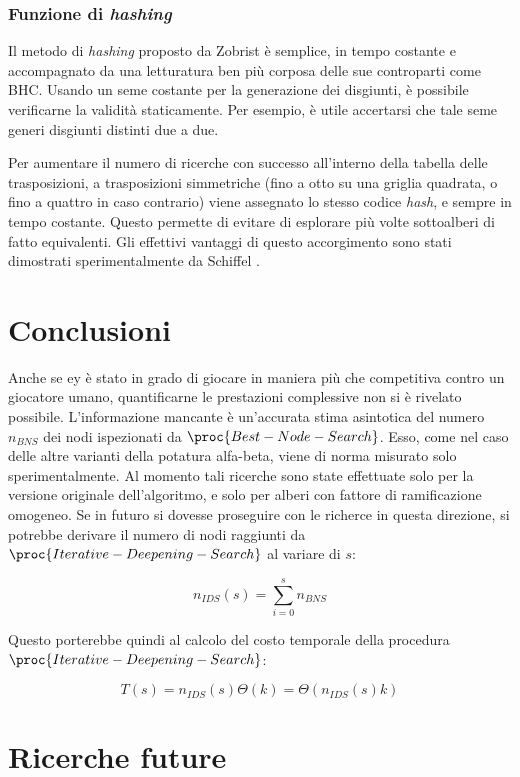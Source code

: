 \documentclass{article}
\begin{document}
\subsubsection{Funzione di \emph{hashing}}

Il metodo di \emph{hashing} proposto da Zobrist
\cite{edsoai.ocn79990521120120101} è semplice, in tempo costante e accompagnato
da una letturatura ben più corposa delle sue controparti come BHC. Usando un
seme costante per la generazione dei disgiunti, è possibile verificarne la
validità staticamente. Per esempio, è utile accertarsi che tale seme generi
disgiunti distinti due a due.

Per aumentare il numero di ricerche con successo all'interno della tabella delle
trasposizioni, a trasposizioni simmetriche (fino a otto su una griglia quadrata,
o fino a quattro in caso contrario) viene assegnato lo stesso codice
\emph{hash}, e sempre in tempo costante. Questo permette di evitare di esplorare
più volte sottoalberi di fatto equivalenti. Gli effettivi vantaggi di questo
accorgimento sono stati dimostrati sperimentalmente da Schiffel \cite{schiffel}.

\section{Conclusioni}

Anche se {
    ey
} è stato in grado di giocare in maniera più che competitiva contro un giocatore
umano, quantificarne le prestazioni complessive non si è rivelato possibile.
L'informazione mancante è un'accurata stima asintotica del numero $n_{BNS}$
dei nodi ispezionati da $\proc{Best-Node-Search}$. Esso, come nel caso delle
altre varianti della potatura alfa-beta, viene di norma misurato solo
sperimentalmente. Al momento tali ricerche sono state effettuate solo per la
versione originale dell'algoritmo, e solo per alberi con fattore di
ramificazione omogeneo. Se in futuro si dovesse proseguire con le richerce in
questa direzione, si potrebbe derivare il numero di nodi raggiunti da
$\proc{Iterative-Deepening-Search}$ al variare di $s$:

\begin{equation}
  n_{IDS}(s) = \sum_{i = 0}^{s} n_{BNS}
\end{equation}

Questo porterebbe quindi al calcolo del costo temporale della procedura
$\proc{Iterative-Deepening-Search}$:

\begin{equation}
  T(s) = n_{IDS}(s) \Theta(k) = \Theta(n_{IDS}(s) k)
\end{equation}

\section{Ricerche future}

\pagebreak

\begin{sloppypar}
\printbibliography[
  heading=bibintoc
]
\end{sloppypar}
\end{document}
